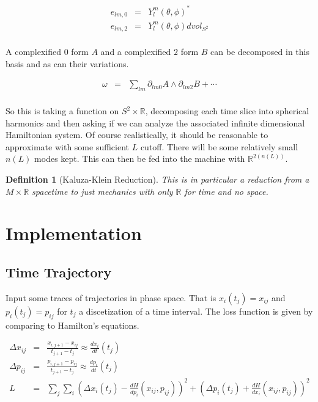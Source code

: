 \documentclass[a4paper,landscape]{article}
\theoremstyle{change}
\newtheorem{definition}[equation]{Definition}
\theoremstyle{nonumberplain}
\numberwithin{equation}{section}
\begin{document}
\begin{eqnarray*}
e_{lm,0} &=& Y_l^m (\theta , \phi)^*\\
e_{lm,2} &=& Y_l^m (\theta , \phi) dvol_{S^2}\\
\end{eqnarray*}

A complexified $0$ form $A$ and a complexified $2$ form $B$ can be decomposed in this basis and as can their variations.

\begin{eqnarray*}
\omega &=& \sum_{lm} \partial_{lm0} A \wedge \partial_{lm2} B + \cdots\\
\end{eqnarray*}

So this is taking a function on $S^2 \times \mathbb{R}$, decomposing each time slice into spherical harmonics and then asking if we can analyze the associated infinite dimensional Hamiltonian system. Of course realistically, it should be reasonable to approximate with some sufficient $L$ cutoff. There will be some relatively small $n(L)$ modes kept. This can then be fed into the machine with $\mathbb{R}^{2(n(L))}$.

\begin{definition}[Kaluza-Klein Reduction]
This is in particular a reduction from a $M \times \mathbb{R}$ spacetime to just mechanics with only $\mathbb{R}$ for time and no space.
\end{definition}

\section{Implementation}

\subsection{Time Trajectory}

Input some traces of trajectories in phase space. That is $x_i (t_j) = x_{ij}$ and $p_i (t_j)=p_{ij}$ for $t_j$ a discetization of a time interval. The loss function is given by comparing to Hamilton's equations.

\begin{eqnarray*}
\Delta x_{ij} &=& \frac{x_{i,j+1} - x_{ij}}{t_{j+1} - t_j} \approx \frac{dx_i}{dt} (t_j)\\
\Delta p_{ij} &=& \frac{p_{i,j+1} - p_{ij}}{t_{j+1} - t_j} \approx \frac{dp_i}{dt} (t_j)\\
L &=& \sum_j \sum_i (\Delta x_i (t_j)  - \frac{dH}{dp_i} (x_{ij} , p_{ij} ))^2 + (\Delta p_i (t_j)  + \frac{dH}{dx_i} (x_{ij} , p_{ij} ))^2
\end{eqnarray*}
\end{document}
